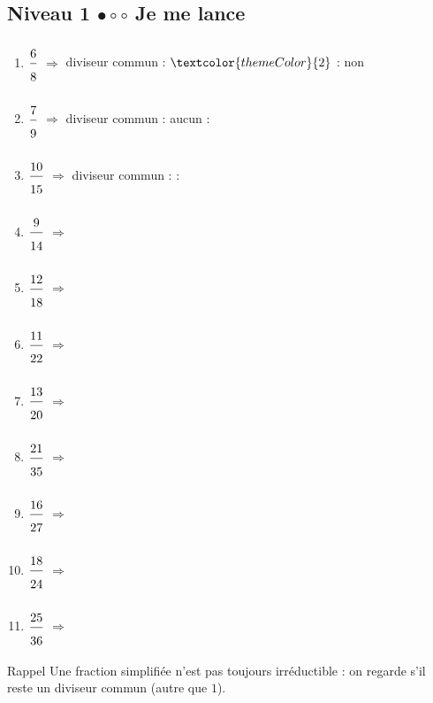  
\newpage
\subsection{Niveau 1 \quad $\bullet\circ\circ$ \quad Je me lance}
 
 
\begin{enumerate}[leftmargin=*,align=parleft, label=\alph*), itemsep=9pt]
\item $\FA{6}{8}$ \quad $\Longrightarrow$ \quad diviseur commun : $\textcolor{themeColor}{2}$ \quad : \quad \textcolor{themeColor}{non}
\item $\FA{7}{9}$ \quad $\Longrightarrow$ \quad diviseur commun : \textcolor{themeColor}{aucun} \quad : \quad \Case
\item $\FA{10}{15}$ \quad $\Longrightarrow$ \quad diviseur commun : \CaseC \quad : \quad \Case
\item $\FA{9}{14}$ \quad $\Longrightarrow$
\item $\FA{12}{18}$ \quad $\Longrightarrow$
\item $\FA{11}{22}$ \quad $\Longrightarrow$
\item $\FA{13}{20}$ \quad $\Longrightarrow$
\item $\FA{21}{35}$ \quad $\Longrightarrow$
\item $\FA{16}{27}$ \quad $\Longrightarrow$
\item $\FA{18}{24}$ \quad $\Longrightarrow$
\item $\FA{25}{36}$ \quad $\Longrightarrow$
\end{enumerate}
 
\newpage
{}
 
\begin{astuce}{Rappel}
Une fraction simplifiée n'est pas toujours irréductible : on regarde s'il reste un diviseur commun (autre que $1$).
\end{astuce}
 

